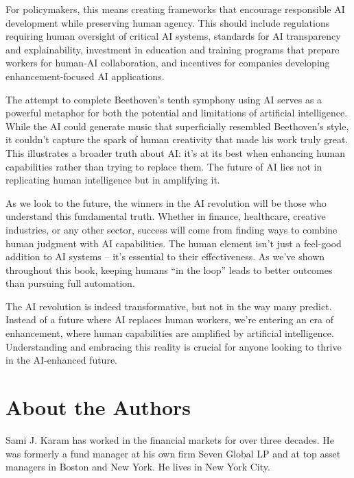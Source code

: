 \documentclass[
  Letterpaper,
]{scrbook}
\begin{document}
For policymakers, this means creating frameworks that encourage
responsible AI development while preserving human agency. This should
include regulations requiring human oversight of critical AI systems,
standards for AI transparency and explainability, investment in
education and training programs that prepare workers for human-AI
collaboration, and incentives for companies developing
enhancement-focused AI applications.

The attempt to complete Beethoven's tenth symphony using AI serves as a
powerful metaphor for both the potential and limitations of artificial
intelligence. While the AI could generate music that superficially
resembled Beethoven's style, it couldn't capture the spark of human
creativity that made his work truly great. This illustrates a broader
truth about AI: it's at its best when enhancing human capabilities
rather than trying to replace them. The future of AI lies not in
replicating human intelligence but in amplifying it.

As we look to the future, the winners in the AI revolution will be those
who understand this fundamental truth. Whether in finance, healthcare,
creative industries, or any other sector, success will come from finding
ways to combine human judgment with AI capabilities. The human element
isn't just a feel-good addition to AI systems -- it's essential to their
effectiveness. As we've shown throughout this book, keeping humans ``in
the loop'' leads to better outcomes than pursuing full automation.

The AI revolution is indeed transformative, but not in the way many
predict. Instead of a future where AI replaces human workers, we're
entering an era of enhancement, where human capabilities are amplified
by artificial intelligence. Understanding and embracing this reality is
crucial for anyone looking to thrive in the AI-enhanced future.


\chapter*{About the Authors}\label{about-the-authors}


Sami J. Karam has worked in the financial markets for over three
decades. He was formerly a fund manager at his own firm Seven Global LP
and at top asset managers in Boston and New York. He lives in New York
City.
\end{document}
